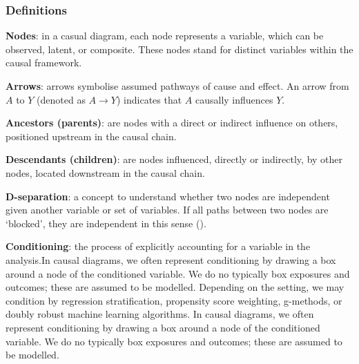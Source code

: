 \documentclass[
  singlecolumn,
  9pt]{article}
\begin{document}
\subsubsection{Definitions}\label{definitions}

\textbf{Nodes}: in a casual diagram, each node represents a variable,
which can be observed, latent, or composite. These nodes stand for
distinct variables within the causal framework.

\textbf{Arrows}: arrows symbolise assumed pathways of cause and effect.
An arrow from \(A\) to \(Y\) (denoted as \(A \rightarrow Y\)) indicates
that \(A\) causally influences \(Y\).

\textbf{Ancestors (parents)}: are nodes with a direct or indirect
influence on others, positioned upstream in the causal chain.

\textbf{Descendants (children)}: are nodes influenced, directly or
indirectly, by other nodes, located downstream in the causal chain.

\textbf{D-separation}: a concept to understand whether two nodes are
independent given another variable or set of variables. If all paths
between two nodes are `blocked', they are independent in this sense
().

\textbf{Conditioning}: the process of explicitly accounting for a
variable in the analysis.In causal diagrams, we often represent
conditioning by drawing a box around a node of the conditioned variable.
We do no typically box exposures and outcomes; these are assumed to be
modelled. Depending on the setting, we may condition by regression
stratification, propensity score weighting, g-methods, or doubly robust
machine learning algorithms. In causal diagrams, we often represent
conditioning by drawing a box around a node of the conditioned variable.
We do no typically box exposures and outcomes; these are assumed to be
modelled.
\end{document}
